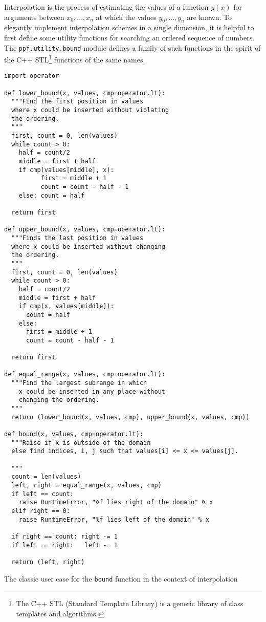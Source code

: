 Interpolation is the process of estimating the values of a function
$y(x)$ for arguments between $x_{0},\ldots,x_{n}$ at which the values
$y_{0},\ldots,y_{n}$ are known. To elegantly implement interpolation
schemes in a single dimension, it is helpful to first define some
utility functions for searching an ordered sequence of numbers. The
\verb|ppf.utility.bound| module defines a family of such functions in
the spirit of the C++ STL\footnote{The C++ STL (Standard Template
Library) is a generic library of class templates and algorithms.}
functions of the same names.
\begin{verbatim}
import operator

def lower_bound(x, values, cmp=operator.lt):
  """Find the first position in values
  where x could be inserted without violating
  the ordering.
  """
  first, count = 0, len(values)
  while count > 0:
    half = count/2
    middle = first + half
    if cmp(values[middle], x):
          first = middle + 1
          count = count - half - 1
    else: count = half

  return first

def upper_bound(x, values, cmp=operator.lt):
  """Finds the last position in values
  where x could be inserted without changing
  the ordering.
  """
  first, count = 0, len(values)
  while count > 0:
    half = count/2
    middle = first + half
    if cmp(x, values[middle]):
      count = half
    else:
      first = middle + 1
      count = count - half - 1

  return first

def equal_range(x, values, cmp=operator.lt):
  """Find the largest subrange in which
    x could be inserted in any place without
    changing the ordering.
  """
  return (lower_bound(x, values, cmp), upper_bound(x, values, cmp))

def bound(x, values, cmp=operator.lt):
  """Raise if x is outside of the domain
  else find indices, i, j such that values[i] <= x <= values[j].

  """
  count = len(values)
  left, right = equal_range(x, values, cmp)
  if left == count:
    raise RuntimeError, "%f lies right of the domain" % x
  elif right == 0:
    raise RuntimeError, "%f lies left of the domain" % x

  if right == count: right -= 1
  if left == right:   left -= 1

  return (left, right)
\end{verbatim}
The classic user case for the \verb|bound| function in the context of interpolation 
